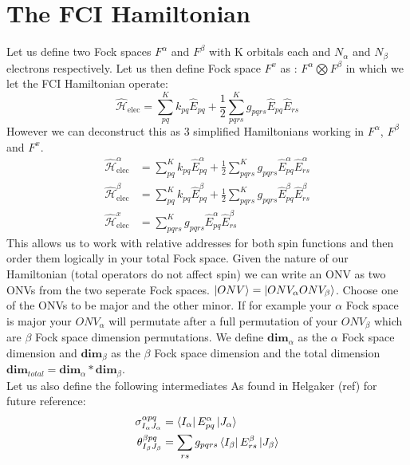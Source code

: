 
\section{The FCI Hamiltonian}
Let us define two Fock spaces $F^\alpha$ and $F^\beta$ with K orbitals each and $N_\alpha$ and $N_\beta$ electrons respectively.
Let us then define Fock space $F^x$ as : $F^\alpha  \bigotimes F^\beta$ in which we let the FCI Hamiltonian operate:
\begin{equation}\label{eq:ham}
    \hat{\mathcal{H}}_\text{elec} = \sum_{pq}^K k_{pq} \hat{E}_{pq} + \frac{1}{2} \sum_{pqrs}^K g_{pqrs} \hat{E}_{pq} \hat{E}_{rs}
\end{equation}
However we can deconstruct this as 3 simplified Hamiltonians working in $F^\alpha$, $F^\beta$ and $F^x$.
\begin{align}
    \hat{\mathcal{H}}^{\alpha}_\text{elec} &= \sum_{pq}^K k_{pq} \hat{E}^{\alpha}_{pq} + \frac{1}{2} \sum_{pqrs}^K g_{pqrs} \hat{E}_{pq}^{\alpha} \hat{E}^{\alpha}_{rs} \label{eq:halpha} \\
    \hat{\mathcal{H}}^{\beta}_\text{elec} &= \sum_{pq}^K k_{pq} \hat{E}^{\beta}_{pq} + \frac{1}{2} \sum_{pqrs}^K g_{pqrs} \hat{E}_{pq}^{\beta} \hat{E}^{\beta}_{rs} \label{eq:hbeta} \\
    \hat{\mathcal{H}}^{x}_\text{elec} &= \sum_{pqrs}^K g_{pqrs} \hat{E}_{pq}^{\alpha} \hat{E}^{\beta}_{rs} \label{eq:hmix}
\end{align}
This allows us to work with relative addresses for both spin functions and then order them logically in your total Fock space. Given the nature of our Hamiltonian (total operators do not affect spin) we can write an ONV as two ONVs from the two seperate Fock spaces. $\ket{ONV} = \ket{ONV_\alpha ONV_\beta}$. Choose one of the ONVs to be major and the other minor. If for example your $\alpha$ Fock space is major your $ONV_\alpha$ will permutate after a full permutation of your $ONV_\beta$ which are $\beta$ Fock space dimension permutations.
We define $\textbf{dim}_\alpha$ as the $\alpha$ Fock space dimension and $\textbf{dim}_\beta$ as the $\beta$ Fock space dimension and the total dimension $\textbf{dim}_{total} = \textbf{dim}_\alpha * \textbf{dim}_\beta$. \\
Let us also define the following intermediates As found in Helgaker (ref) for future reference:
\begin{align}
\sigma^{\alpha pq}_{I_\alpha J_\alpha} & = \bra{I_\alpha} E^{\alpha}_{pq} \ket{J_\alpha} \label{eq:sigma} \\
\theta^{\beta pq}_{I_\beta J_\beta} & = \sum_{rs} g_{pqrs} \bra{I_\beta} E^{\beta}_{rs} \ket{J_\beta} \label{eq:theta}
\end{align}

